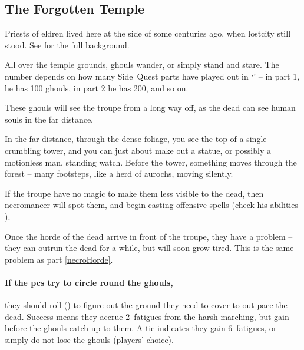 \subsection[Forgotten Temple]{The Forgotten Temple}
\label{necromancers_lair}


Priests of \gls{eldren} lived here at the side of  some centuries ago, when \gls{lostcity} still stood.
See  for the full background.

All over the temple grounds, ghouls wander, or simply stand and stare.
The number depends on how many Side~Quest parts have played out in `' -- in part 1, he has 100 ghouls, in part 2 he has 200, and so on.

These ghouls will see the troupe from a long way off, as the dead can see human souls in the far distance.

\begin{boxtext}
  In the far distance, through the dense foliage, you see the top of a single crumbling tower, and you can just about make out a statue, or possibly a motionless man, standing watch.
  Before the tower, something moves through the forest -- many footsteps, like a herd of aurochs, moving silently.%
\end{boxtext}

If the troupe have no magic to make them less visible to the dead, then \gls{necromancer} will spot them, and begin casting offensive spells (check his abilities ).

Once the horde of the dead arrive in front of the troupe, they have a problem -- they can outrun the dead for a while, but will soon grow tired.
This is the same problem as part \vref{necroHorde}.

\paragraph{If the \glspl{pc} try to circle round the ghouls,}
they should roll  (\tn[8]) to figure out the ground they need to cover to out-pace the dead.
Success means they accrue 2~\glspl{fatigue} from the harsh marching, but gain  before the ghouls catch up to them.
A tie indicates they gain 6~\glspl{fatigue}, or simply do not lose the ghouls (players' choice).


